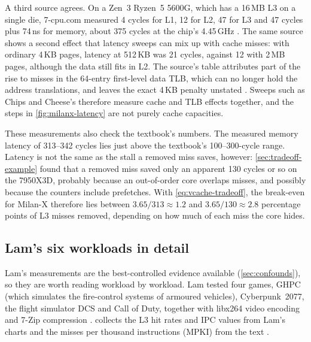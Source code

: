 A third source agrees. On a Zen~3 Ryzen~5 5600G, which has a 16\,MB L3 on a single die, 7-cpu.com measured 4 cycles for L1, 12 for L2, 47 for L3 and 47 cycles plus 74\,ns for memory, about 375 cycles at the chip's 4.45\,GHz \cite{7-cpu.comAMDZen3}. The same source shows a second effect that latency sweeps can mix up with cache misses: with ordinary 4\,KB pages, latency at 512\,KB was 21 cycles, against 12 with 2\,MB pages, although the data still fits in L2. The source's table attributes part of the rise to misses in the 64-entry first-level data TLB, which can no longer hold the address translations, and leaves the exact 4\,KB penalty unstated \cite{7-cpu.comAMDZen3}. Sweeps such as Chips and Cheese's therefore measure cache and TLB effects together, and the steps in \cref{fig:milanx-latency} are not purely cache capacities.

These measurements also check the textbook's numbers. The measured memory latency of 313--342 cycles lies just above the textbook's 100--300-cycle range. Latency is not the same as the stall a removed miss saves, however: \cref{sec:tradeoff-example} found that a removed miss saved only an apparent 130 cycles or so on the 7950X3D, probably because an out-of-order core overlaps misses, and possibly because the counters include prefetches. With \cref{eq:vcache-tradeoff}, the break-even for Milan-X therefore lies between $3.65/313 \approx 1.2$ and $3.65/130 \approx 2.8$ percentage points of L3 misses removed, depending on how much of each miss the core hides.



\subsection{Lam's six workloads in detail}
\label{sec:lam-detail}
Lam's measurements are the best-controlled evidence available (\cref{sec:confounds}), so they are worth reading workload by workload. Lam tested four games, GHPC (which simulates the fire-control systems of armoured vehicles), Cyberpunk~2077, the flight simulator DCS and Call of Duty, together with libx264 video encoding and 7-Zip compression \cite{lamAMDs7950X3DZen2023}.  collects the L3 hit rates and IPC values from Lam's charts and the misses per thousand instructions (MPKI) from the text \cite{lamAMDs7950X3DZen2023}.

